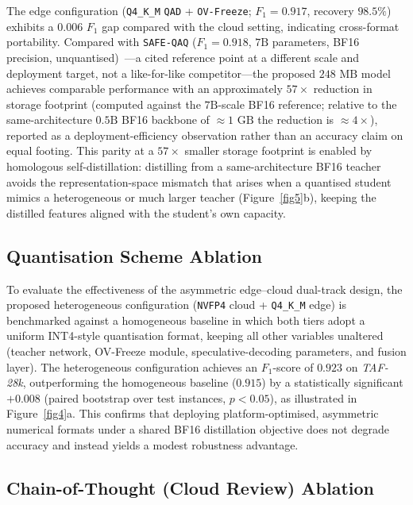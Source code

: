 \documentclass[a4paper,fleqn]{cas-sc}
\begin{document}
The edge configuration (\texttt{Q4\_K\_M} \texttt{QAD} + \texttt{OV-Freeze}; $F_1 = 0.917$, recovery $98.5\%$) exhibits a $0.006$ $F_1$ gap compared with the cloud setting, indicating cross-format portability. Compared with \texttt{SAFE-QAQ} ($F_1 = 0.918$, $7\text{B}$ parameters, BF16 precision, unquantised)~\citep{2}---a cited reference point at a different scale and deployment target, not a like-for-like competitor---the proposed $248\text{~MB}$ model achieves comparable performance with an approximately $57\times$ reduction in storage footprint (computed against the $7\text{B}$-scale BF16 reference; relative to the same-architecture $0.5\text{B}$ BF16 backbone of $\approx 1\text{~GB}$ the reduction is $\approx 4\times$), reported as a deployment-efficiency observation rather than an accuracy claim on equal footing. This parity at a $57\times$ smaller storage footprint is enabled by homologous self-distillation: distilling from a same-architecture BF16 teacher avoids the representation-space mismatch that arises when a quantised student mimics a heterogeneous or much larger teacher (Figure~\ref{fig5}b), keeping the distilled features aligned with the student's own capacity.

\subsection{Quantisation Scheme Ablation}\label{sec:quant-ablation}

To evaluate the effectiveness of the asymmetric edge--cloud dual-track design, the proposed heterogeneous configuration (\texttt{NVFP4} cloud + \texttt{Q4\_K\_M} edge) is benchmarked against a homogeneous baseline in which both tiers adopt a uniform INT4-style quantisation format, keeping all other variables unaltered (teacher network, OV-Freeze module, speculative-decoding parameters, and fusion layer). The heterogeneous configuration achieves an $F_1$-score of $0.923$ on \textit{TAF-28k}, outperforming the homogeneous baseline ($0.915$) by a statistically significant $+0.008$ (paired bootstrap over test instances, $p<0.05$), as illustrated in Figure~\ref{fig4}a. This confirms that deploying platform-optimised, asymmetric numerical formats under a shared BF16 distillation objective does not degrade accuracy and instead yields a modest robustness advantage.

\subsection{Chain-of-Thought (Cloud Review) Ablation}\label{sec:cot-ablation}
\end{document}
